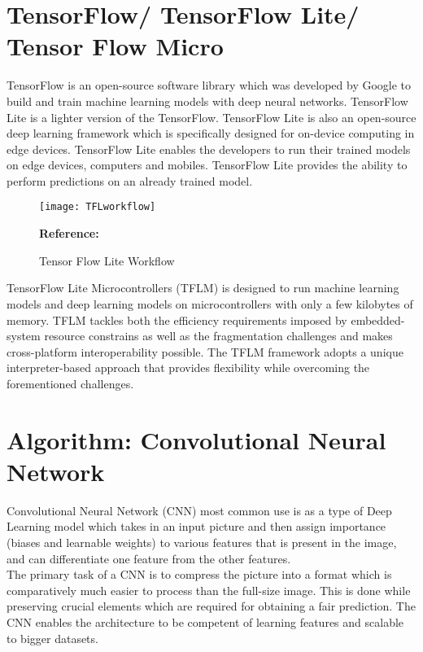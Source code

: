 \section{TensorFlow/ TensorFlow Lite/ Tensor Flow Micro}
TensorFlow is an open-source software library which was developed by Google to build and train machine learning models with deep neural networks. TensorFlow Lite is a lighter version of the TensorFlow.
TensorFlow Lite is also an open-source deep learning framework which is specifically designed for on-device computing in edge devices. TensorFlow Lite enables the developers to run their trained models on edge devices, computers and mobiles. TensorFlow Lite provides the ability to perform predictions on an already trained model.\autocite{Boesch:2022}\\
\begin{figure}  [H]
	\begin{center}
		\texttt{[image: TFLworkflow]}
		\caption{Tensor Flow Lite Workflow} 
		\label{fig:Visual Studio Code Download Options}
		\footnotesize \textbf{Reference:} \autocite{Khandelwal:2020}
	\end{center}
\end{figure}
TensorFlow Lite Microcontrollers (TFLM) is designed to run machine learning models and deep learning models on microcontrollers with only a few kilobytes of memory. TFLM tackles both the efficiency requirements imposed by embedded-system resource constrains as well as the fragmentation challenges and makes cross-platform interoperability possible. The TFLM framework adopts a unique interpreter-based approach that provides flexibility while overcoming the forementioned challenges.\autocite{David:2021}
\section{Algorithm: Convolutional Neural Network}

Convolutional Neural Network (CNN) most common use is as a type of Deep Learning model which takes in an input picture and then assign importance (biases and learnable weights) to various features that is present in the image, and can differentiate one feature from the other features. \\

The primary task of a CNN is to compress the picture into a format which is comparatively much easier to process than the full-size image. This is done while preserving crucial elements which are required for obtaining a fair prediction. The CNN enables the architecture to be competent of learning features and scalable to bigger datasets. \\ \autocite{Saha:2018}


